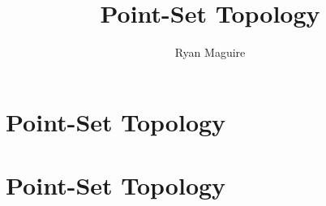 \documentclass[crop=false,class=book,oneside]{standalone}
\begin{document}
    \ifx\ifmathcourses\undefined
        \title{Point-Set Topology}
        \author{Ryan Maguire}
        \date{\vspace{-5ex}}
        \maketitle
        \tableofcontents
        \clearpage
        \chapter*{Point-Set Topology}
        \vspace{10ex}
        \setcounter{chapter}{1}
    \else
        \chapter{Point-Set Topology}
    \fi
\end{document}
